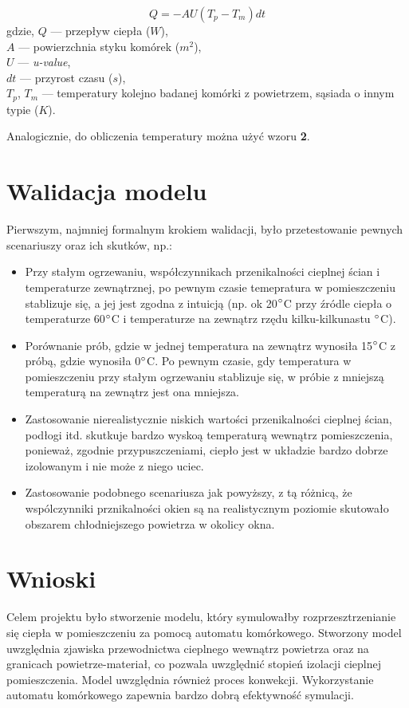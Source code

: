 \documentclass{article}
\begin{document}
\begin{equation}
Q = -AU(T_p-T_m)dt
\end{equation}
gdzie,
$Q$ --- przepływ ciepła ($W$), \\
$A$ --- powierzchnia styku komórek ($m^2$), \\
$U$ --- \textit{u-value}, \\
$dt$ --- przyrost czasu ($s$), \\
$T_p$, $T_m$ --- temperatury kolejno badanej komórki z powietrzem, sąsiada o innym typie ($K$).

Analogicznie, do obliczenia temperatury można użyć wzoru \textbf{2}.

\section{Walidacja modelu}
Pierwszym, najmniej formalnym krokiem walidacji, było przetestowanie pewnych scenariuszy oraz ich skutków, np.:
\begin{itemize}
    \item
    Przy stałym ogrzewaniu, współczynnikach przenikalności cieplnej ścian i temperaturze zewnątrznej, po pewnym czasie temepratura
    w pomieszczeniu stablizuje się, a jej jest zgodna z intuicją (np. ok 20$\degree$C przy źródle ciepła o temperaturze 60$\degree$C i 
    temperaturze na zewnątrz rzędu kilku-kilkunastu $\degree$C).
    \item 
    Porównanie prób, gdzie w jednej temperatura na zewnątrz wynosiła 15$\degree$C z próbą, gdzie wynosiła 0$\degree$C. Po pewnym czasie,
    gdy temperatura w pomieszczeniu przy stałym ogrzewaniu stablizuje się, w próbie z mniejszą temperaturą na zewnątrz jest ona mniejsza.
    \item
    Zastosowanie nierealistycznie niskich wartości przenikalności cieplnej ścian, podłogi itd. skutkuje bardzo wyskoą temperaturą
    wewnątrz pomieszczenia, ponieważ, zgodnie przypuszczeniami, ciepło jest w układzie bardzo dobrze izolowanym i nie może z niego uciec.
    \item
    Zastosowanie podobnego scenariusza jak powyższy, z tą różnicą, że wspólczynniki prznikalności okien są na realistycznym poziomie
    skutowało obszarem chłodniejszego powietrza w okolicy okna. 

\end{itemize}


\section{Wnioski}
Celem projektu było stworzenie modelu, który symulowałby rozprzesztrzenianie się ciepła w pomieszczeniu za pomocą automatu komórkowego.
Stworzony model uwzględnia zjawiska przewodnictwa cieplnego wewnątrz powietrza oraz na granicach powietrze-materiał, 
co pozwala uwzględnić stopień izolacji cieplnej pomieszczenia. Model uwzględnia również proces konwekcji. Wykorzystanie automatu komórkowego
zapewnia bardzo dobrą efektywność symulacji.
\end{document}

